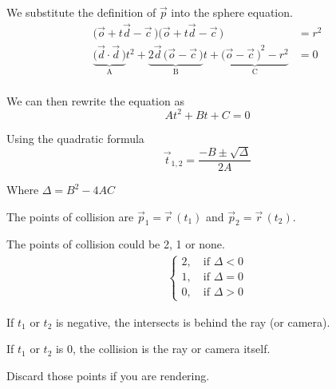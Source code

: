\documentclass[a4paper]{article}
\begin{document}
We substitute the definition of \(\vec{p}\) into the sphere equation.
\begin{align*}
	\Big(\vec{o}+t\vec{d}-\vec{c}\,\Big)\Big(\vec{o}+t\vec{d}-\vec{c}\,\Big)&=r^2\\
	\underbrace{\Big(\vec{d}\cdot\vec{d}\,\Big)}_\text{A}t^2+
	\underbrace{2\vec{d}\,\Big(\vec{o}-\vec{c}\,\Big)}_\text{B}t+
	\underbrace{{\Big(\vec{o}-\vec{c}\,\Big)}^2-r^2}_\text{C}&=0\\
\end{align*}

We can then rewrite the equation as
\[
	At^2+Bt+C=0
\]

Using the quadratic formula
\[
	\vec{t}_{1,2}=\frac{-B\pm\sqrt{\Delta}}{2A}
\]

Where \(\Delta=B^2-4AC\)

The points of collision are \(\vec{p}_1=\vec{r}\,(t_1)\) and \(\vec{p}_2=\vec{r}\,(t_2)\).

The points of collision could be 2, 1 or none.
\begin{align*}
	\begin{cases}
		2,\quad\text{if }\Delta<0\\
		1,\quad\text{if }\Delta=0\\
		0,\quad\text{if }\Delta>0
	\end{cases}
\end{align*}

If \(t_1\) or \(t_2\) is negative, the intersects is behind the ray (or camera).

If \(t_1\) or \(t_2\) is \(0\), the collision is the ray or camera itself.

Discard those points if you are rendering.
\end{document}
